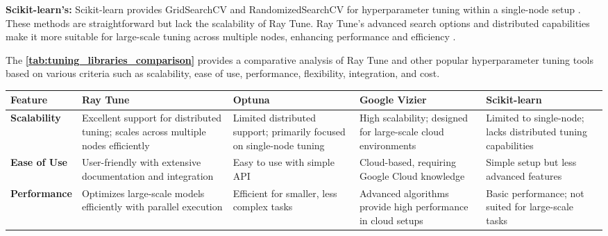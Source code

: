 \textbf{Scikit-learn’s:} Scikit-learn provides GridSearchCV and RandomizedSearchCV for hyperparameter tuning within a single-node setup \cite{scikit_learn}. These methods are straightforward but lack the scalability of Ray Tune. Ray Tune’s advanced search options and distributed capabilities make it more suitable for large-scale tuning across multiple nodes, enhancing performance and efficiency \cite{anyscale_ray_tune}.

The \textbf{\autoref{tab:tuning_libraries_comparison}} provides a comparative analysis of Ray Tune and other popular hyperparameter tuning tools based on various criteria such as scalability, ease of use, performance, flexibility, integration, and cost.

\begin{table}[h]
\centering
\begin{tabular}{|p{2.5cm}|p{2.8cm}|p{2.8cm}|p{2.8cm}|p{2.8cm}|}
\hline
\textbf{Feature} & \textbf{Ray Tune} & \textbf{Optuna} & \textbf{Google Vizier} & \textbf{Scikit-learn} \\ 
\hline
\textbf{Scalability} & Excellent support for distributed tuning; scales across multiple nodes efficiently \cite{anyscale_ray_tune} & Limited distributed support; primarily focused on single-node tuning \cite{akiba2019optuna}  & High scalability; designed for large-scale cloud environments \cite{google_vizier} & Limited to single-node; lacks distributed tuning capabilities \cite{scikit_learn} \\ 
\hline
\textbf{Ease of Use} & User-friendly with extensive documentation and integration \cite{anyscale_ray_tune} & Easy to use with simple API \cite{akiba2019optuna} & Cloud-based, requiring Google Cloud knowledge \cite{google_vizier} & Simple setup but less advanced features \cite{scikit_learn} \\ 
\hline
\textbf{Performance} & Optimizes large-scale models efficiently with parallel execution \cite{anyscale_ray_tune} & Efficient for smaller, less complex tasks \cite{akiba2019optuna}  & Advanced algorithms provide high performance in cloud setups \cite{google_vizier} & Basic performance; not suited for large-scale tasks \cite{scikit_learn} \\ 
\hline
\end{tabular}
\end{table}

